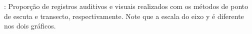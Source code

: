 \label{fig:aves1}: Proporção de registros auditivos e visuais realizados com os métodos de ponto de escuta e transecto, 
respectivamente. Note que a escala do eixo y é diferente nos dois gráficos.

